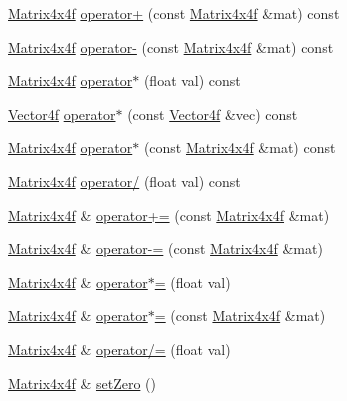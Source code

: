 \begin{DoxyCompactItemize}
\item 
\hyperlink{classh2_1_1_matrix4x4f}{Matrix4x4f} \hyperlink{classh2_1_1_matrix4x4f_a3dc5de4d17612851b858618cc340f61d}{operator+} (const \hyperlink{classh2_1_1_matrix4x4f}{Matrix4x4f} \&mat) const 
\item 
\hyperlink{classh2_1_1_matrix4x4f}{Matrix4x4f} \hyperlink{classh2_1_1_matrix4x4f_af88f88906552bfc9237fc81ee8940538}{operator-\/} (const \hyperlink{classh2_1_1_matrix4x4f}{Matrix4x4f} \&mat) const 
\item 
\hyperlink{classh2_1_1_matrix4x4f}{Matrix4x4f} \hyperlink{classh2_1_1_matrix4x4f_a1179515982f91e74799fac1bab1a75f8}{operator$\ast$} (float val) const 
\item 
\hyperlink{classh2_1_1_vector4f}{Vector4f} \hyperlink{classh2_1_1_matrix4x4f_a9875eb806c71415aac7652c5d51d057c}{operator$\ast$} (const \hyperlink{classh2_1_1_vector4f}{Vector4f} \&vec) const 
\item 
\hyperlink{classh2_1_1_matrix4x4f}{Matrix4x4f} \hyperlink{classh2_1_1_matrix4x4f_ab1a9a9e680b020689825275f89082142}{operator$\ast$} (const \hyperlink{classh2_1_1_matrix4x4f}{Matrix4x4f} \&mat) const 
\item 
\hyperlink{classh2_1_1_matrix4x4f}{Matrix4x4f} \hyperlink{classh2_1_1_matrix4x4f_acbeb53dc2033feb0a2732ccdd3b08335}{operator/} (float val) const 
\item 
\hyperlink{classh2_1_1_matrix4x4f}{Matrix4x4f} \& \hyperlink{classh2_1_1_matrix4x4f_a773a4edbaec7e1d741b3264e18790bb0}{operator+=} (const \hyperlink{classh2_1_1_matrix4x4f}{Matrix4x4f} \&mat)
\item 
\hyperlink{classh2_1_1_matrix4x4f}{Matrix4x4f} \& \hyperlink{classh2_1_1_matrix4x4f_a49f6a693a9a7dff07ba3146227c00c74}{operator-\/=} (const \hyperlink{classh2_1_1_matrix4x4f}{Matrix4x4f} \&mat)
\item 
\hyperlink{classh2_1_1_matrix4x4f}{Matrix4x4f} \& \hyperlink{classh2_1_1_matrix4x4f_a7bce17358510b818c67833582eb4ac96}{operator$\ast$=} (float val)
\item 
\hyperlink{classh2_1_1_matrix4x4f}{Matrix4x4f} \& \hyperlink{classh2_1_1_matrix4x4f_a4a6f19620ae3c7639f5fb38fa659753a}{operator$\ast$=} (const \hyperlink{classh2_1_1_matrix4x4f}{Matrix4x4f} \&mat)
\item 
\hyperlink{classh2_1_1_matrix4x4f}{Matrix4x4f} \& \hyperlink{classh2_1_1_matrix4x4f_aed2ad9f7102d165377c894d99877c280}{operator/=} (float val)
\item 
\hyperlink{classh2_1_1_matrix4x4f}{Matrix4x4f} \& \hyperlink{classh2_1_1_matrix4x4f_aef8c066ea90245b661d7838a9bbdf12d}{set\-Zero} ()

\end{DoxyCompactItemize}
